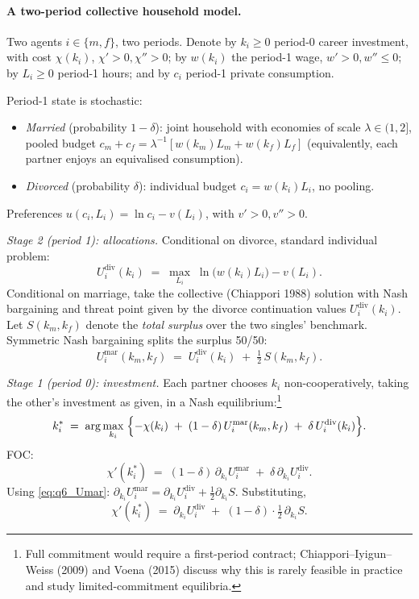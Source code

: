 \documentclass[11pt,a4paper]{article}
\begin{document}
\paragraph{A two-period collective household model.}
Two agents $i\in\{m,f\}$, two periods. Denote by $k_i\geq 0$ period-0 career investment, with cost $\chi(k_i)$, $\chi'>0,\chi''>0$; by $w(k_i)$ the period-1 wage, $w'>0,w''\leq 0$; by $L_i\geq 0$ period-1 hours; and by $c_i$ period-1 private consumption.

Period-1 state is stochastic:
\begin{itemize}[leftmargin=*,itemsep=1pt]
    \item \emph{Married} (probability $1-\delta$): joint household with economies of scale $\lambda\in(1,2]$, pooled budget $c_m+c_f = \lambda^{-1}[w(k_m)L_m+w(k_f)L_f]$ (equivalently, each partner enjoys an equivalised consumption).
    \item \emph{Divorced} (probability $\delta$): individual budget $c_i=w(k_i)L_i$, no pooling.
\end{itemize}
Preferences $u(c_i,L_i)=\ln c_i-v(L_i)$, with $v'>0,v''>0$.

\smallskip
\emph{Stage 2 (period 1): allocations.}
Conditional on divorce, standard individual problem:
\begin{equation}
U_i^{\text{div}}(k_i)\;=\;\max_{L_i}\;\ln\!\bigl(w(k_i)L_i\bigr)-v(L_i).
\label{eq:q6_Udiv}
\end{equation}
Conditional on marriage, take the collective (Chiappori 1988) solution with Nash bargaining and threat point given by the divorce continuation values $U_i^{\text{div}}(k_i)$. Let $S(k_m,k_f)$ denote the \emph{total surplus} over the two singles' benchmark. Symmetric Nash bargaining splits the surplus 50/50:
\begin{equation}
U_i^{\text{mar}}(k_m,k_f)\;=\;U_i^{\text{div}}(k_i)\;+\;\tfrac{1}{2}\,S(k_m,k_f).
\label{eq:q6_Umar}
\end{equation}

\smallskip
\emph{Stage 1 (period 0): investment.}
Each partner chooses $k_i$ non-cooperatively, taking the other's investment as given, in a Nash equilibrium:\footnote{Full commitment would require a first-period contract; Chiappori--Iyigun--Weiss (2009) and Voena (2015) discuss why this is rarely feasible in practice and study limited-commitment equilibria.}
\begin{equation}
k_i^{*}\;=\;\arg\max_{k_i}\;\Bigl\{-\chi(k_i)\;+\;(1-\delta)\,U_i^{\text{mar}}(k_m,k_f)\;+\;\delta\,U_i^{\text{div}}(k_i)\Bigr\}.
\label{eq:q6_invst}
\end{equation}
FOC:
\begin{equation}
\chi'(k_i^{*})\;=\;(1-\delta)\,\partial_{k_i}U_i^{\text{mar}}\;+\;\delta\,\partial_{k_i}U_i^{\text{div}}.
\label{eq:q6_FOC}
\end{equation}
Using \eqref{eq:q6_Umar}: $\partial_{k_i}U_i^{\text{mar}}=\partial_{k_i}U_i^{\text{div}}+\tfrac{1}{2}\partial_{k_i}S$. Substituting,
\begin{equation}
\chi'(k_i^{*})\;=\;\partial_{k_i}U_i^{\text{div}}\;+\;(1-\delta)\cdot\tfrac{1}{2}\,\partial_{k_i}S.
\label{eq:q6_FOC2}
\end{equation}
\end{document}
